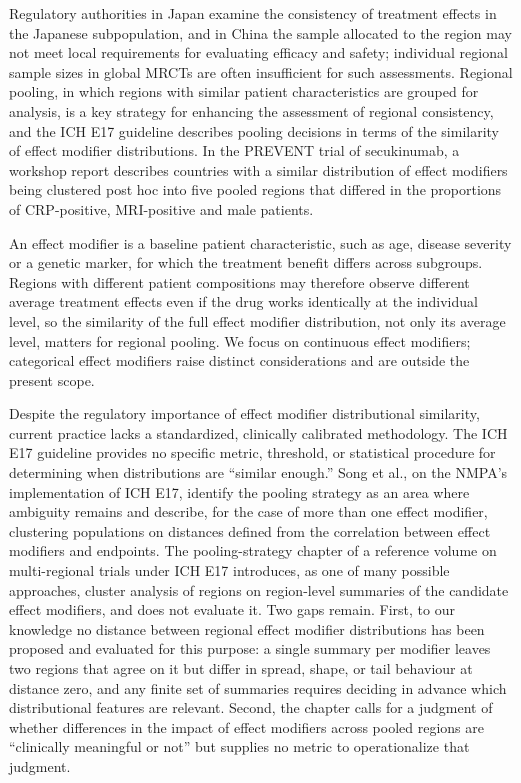 \documentclass[AMA,Times1COL]{WileyNJDv5}
\begin{document}
Regulatory authorities in Japan examine the consistency of treatment effects in the Japanese subpopulation,\cite{matsushima2024} and in China the sample allocated to the region may not meet local requirements for evaluating efficacy and safety;\cite{song2025} individual regional sample sizes in global MRCTs are often insufficient for such assessments. Regional pooling, in which regions with similar patient characteristics are grouped for analysis, is a key strategy for enhancing the assessment of regional consistency, and the ICH E17 guideline describes pooling decisions in terms of the similarity of effect modifier distributions.\cite{iche17} In the PREVENT trial of secukinumab, a workshop report describes countries with a similar distribution of effect modifiers being clustered post hoc into five pooled regions that differed in the proportions of CRP-positive, MRI-positive and male patients.\cite{matsushima2024}

An effect modifier is a baseline patient characteristic, such as age, disease severity or a genetic marker, for which the treatment benefit differs across subgroups. Regions with different patient compositions may therefore observe different average treatment effects even if the drug works identically at the individual level, so the similarity of the full effect modifier distribution, not only its average level, matters for regional pooling. We focus on continuous effect modifiers; categorical effect modifiers raise distinct considerations and are outside the present scope.


Despite the regulatory importance of effect modifier distributional similarity, current practice lacks a standardized, clinically calibrated methodology. The ICH E17 guideline provides no specific metric, threshold, or statistical procedure for determining when distributions are ``similar enough.''\cite{iche17} Song et al., on the NMPA's implementation of ICH E17, identify the pooling strategy as an area where ambiguity remains and describe, for the case of more than one effect modifier, clustering populations on distances defined from the correlation between effect modifiers and endpoints.\cite{song2025} The pooling-strategy chapter of a reference volume on multi-regional trials under ICH E17 introduces, as one of many possible approaches, cluster analysis of regions on region-level summaries of the candidate effect modifiers, and does not evaluate it.\cite{komiyama2024} Two gaps remain. First, to our knowledge no distance between regional effect modifier distributions has been proposed and evaluated for this purpose: a single summary per modifier leaves two regions that agree on it but differ in spread, shape, or tail behaviour at distance zero, and any finite set of summaries requires deciding in advance which distributional features are relevant. Second, the chapter calls for a judgment of whether differences in the impact of effect modifiers across pooled regions are ``clinically meaningful or not''\cite{komiyama2024} but supplies no metric to operationalize that judgment.
\end{document}

